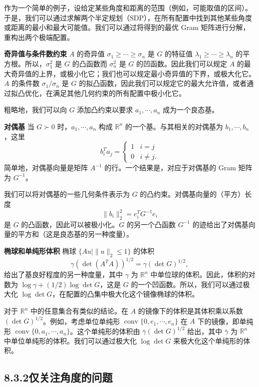 \documentclass[UTF8, 12pt, fontset=fandol, oneside]{ctexart}
\begin{document}
作为一个简单的例子，设给定某些角度和距离的范围（例如，可能取值的区间）。于是，我们可以通过求解两个半定规划（SDP），在所有配置中找到其他某些角度或距离的最小和最大可能值。我们可以通过将得到的最优 Gram 矩阵进行分解，重构出两个极端配置。

\noindent\textbf{奇异值与条件数约束}\quad
$A$ 的奇异值 $\sigma_1\geq\cdots\geq\sigma_n$ 是 $G$ 的特征值 $\lambda_1\geq\cdots\geq\lambda_n$ 的平方根。所以，$\sigma_1^2$ 是 $G$ 的凸函数而 $\sigma_n^2$ 是 $G$ 的凹函数。因此我们可以规定 $A$ 的最大奇异值的上界，或极小化它；我们也可以规定最小奇异值的下界，或极大化它。$A$ 的条件数 $\sigma_1/\sigma_n$ 是 $G$ 的拟凸函数，因此我们可以规定它的最大允许值，或者通过拟凸优化，在满足其他几何约束的所有配置中极小化它。

粗略地，我们可以向 $G$ 添加凸约束以要求 $a_1,\cdots,a_n$ 成为一个良态基。

\noindent\textbf{对偶基}\quad
当 $G\succ 0$ 时，$a_1,\cdots,a_n$ 构成 $\mathbb{R}^n$ 的一个基。与其相关的对偶基为 $b_1,\cdots,b_n$，这里
\[
b_i^Ta_j=
\begin{cases}
1 & i=j\\
0 & i\neq j.
\end{cases}
\]
简单地，对偶基向量是矩阵 $A^{-1}$ 的行。一个结果是，对应于对偶基的 Gram 矩阵为 $G^{-1}$。

我们可以将对偶基的一些几何条件表示为 $G$ 的凸约束。对偶基向量的（平方）长度
\[
\|b_i\|_2^2=e_i^TG^{-1}e_i
\]
是 $G$ 的凸函数，因此可以被极小化。$G$ 的另一个凸函数 $G^{-1}$ 的迹给出了对偶基向量的平方和（这是良态基的另一种度量）。

\noindent\textbf{椭球和单纯形体积}\quad
椭球 $\{Au\mid \|u\|_2\leq 1\}$ 的体积
\[
\gamma(\det(A^TA))^{1/2}=\gamma(\det G)^{1/2},
\]
给出了基良好程度的另一种度量，其中 $\gamma$ 为 $\mathbb{R}^n$ 中单位球的体积。因此，体积的对数为 $\log\gamma+(1/2)\log\det G$，这是 $G$ 的一个凹函数。所以，我们可以通过极大化 $\log\det G$，在配置的凸集中极大化这个镜像椭球的体积。

对于 $\mathbb{R}^n$ 中的任意集合有类似的结论。在 $A$ 的镜像下的体积是其体积乘以系数 $(\det G)^{1/2}$。例如，考虑单位单纯形 $\operatorname{conv}\{0,e_1,\cdots,e_n\}$ 在 $A$ 下的镜像，即单纯形 $\operatorname{conv}\{0,a_1,\cdots,a_n\}$。这个单纯形的体积由 $\bar{\gamma}(\det G)^{1/2}$ 给出，其中 $\bar{\gamma}$ 为 $\mathbb{R}^n$ 中单位单纯形的体积。我们可以通过极大化 $\log\det G$ 来极大化这个单纯形的体积。

\subsection*{8.3.2\quad 仅关注角度的问题}
\end{document}
